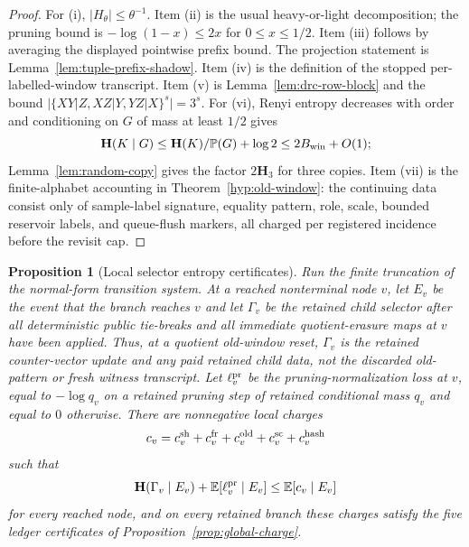 \documentclass[11pt]{article}
\newtheorem{proposition}[theorem]{Proposition}
\newcommand{\Prb}{\mathbb P}
\newcommand{\EE}{\mathbb E}
\newcommand{\bfH}{\mathbf H}
\begin{document}
\begin{proof}
For (i), $|H_\theta|\le\theta^{-1}$.  Item (ii) is the usual heavy-or-light
decomposition; the pruning bound is $-\log(1-x)\le2x$ for $0\le x\le1/2$.
Item (iii) follows by averaging the displayed pointwise prefix bound.  The
projection statement is Lemma~\ref{lem:tuple-prefix-shadow}.  Item (iv) is the
definition of the stopped per-labelled-window transcript.  Item (v) is
Lemma~\ref{lem:drc-row-block} and the bound $|\{XY|Z,XZ|Y,YZ|X\}^s|=3^s$.
For (vi), Renyi entropy decreases with order and conditioning on
$G$ of mass at least $1/2$ gives
\[
  \bfH(K\mid G)\le \bfH(K)/\Prb(G)+\log2\le2B_{\rm win}+O(1);
\]
Lemma~\ref{lem:random-copy} gives the factor $2\bfH_3$ for three copies.
Item (vii) is the finite-alphabet accounting in Theorem~\ref{hyp:old-window}:
the continuing data consist only of sample-label signature, equality pattern,
role, scale, bounded reservoir labels, and queue-flush markers, all charged per
registered incidence before the revisit cap.
\end{proof}

\begin{proposition}[Local selector entropy certificates]
\label{prop:local-selector-certificates}
Run the finite truncation of the normal-form transition system.  At a reached
nonterminal node $v$, let $E_v$ be the event that the branch reaches $v$ and
let $\Gamma_v$ be the retained child selector after all deterministic public
tie-breaks and all immediate quotient-erasure maps at $v$ have been applied.
Thus, at a quotient old-window reset, $\Gamma_v$ is the retained counter-vector
update and any paid retained child data, not the discarded old-pattern or fresh
witness transcript.  Let $\ell_v^{\rm pr}$ be the
pruning-normalization loss at $v$, equal to $-\log q_v$ on a retained pruning
step of retained conditional mass $q_v$ and equal to $0$ otherwise.  There are nonnegative local
charges
\[
  c_v=c_v^{\rm sh}+c_v^{\rm fr}+c_v^{\rm old}
      +c_v^{\rm sc}+c_v^{\rm hash}
\]
such that
\[
  \bfH(\Gamma_v\mid E_v)+\EE[\ell_v^{\rm pr}\mid E_v]\le \EE[c_v\mid E_v]
\]
for every reached node, and on every retained branch these charges satisfy the
five ledger certificates of Proposition~\ref{prop:global-charge}.
\end{proposition}
\end{document}
